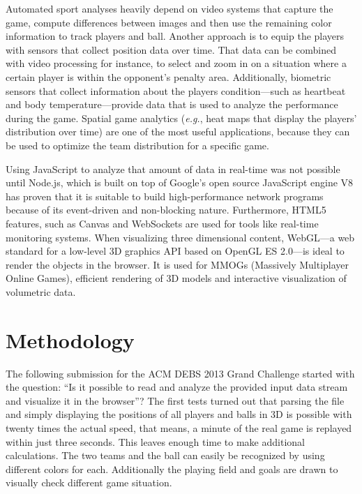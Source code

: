 \documentclass{sig-alternate}
\begin{document}
Automated sport analyses heavily depend on video systems
that capture the game, compute differences between images
and then use the remaining color information
to track players and ball.
Another approach is to equip the players with sensors
that collect position data over time.
That data can be combined with video processing for instance,
to select and zoom in on a situation where a certain player
is within the opponent’s penalty area.
Additionally, biometric sensors that collect information
about the players condition---such as heartbeat
and body temperature---provide data that is used
to analyze the performance during the game.
Spatial game analytics (\emph{e.g.}, heat maps
that display the players’ distribution over time)
are one of the most useful applications,
because they can be used to optimize the team distribution
for a specific game.

Using JavaScript to analyze that amount of data in real-time
was not possible until Node.js,
which is built on top of Google's open source JavaScript engine V8
has proven that it is suitable to build
high-performance network programs
because of its event-driven and non-blocking nature.
Furthermore, HTML5 features, such as Canvas and WebSockets
are used for tools like real-time monitoring systems.
When visualizing three dimensional content,
WebGL---a web standard for a low-level 3D graphics API
based on OpenGL ES 2.0---is ideal to render the objects
in the browser.
It is used for MMOGs (Massively Multiplayer Online Games),
efficient rendering of 3D models
and interactive visualization of volumetric data.

\section{Methodology}
\label{sec:methodology}

The following submission for the ACM DEBS 2013 Grand Challenge
started with the question: ``Is it possible to read and analyze
the provided input data stream and visualize it in the browser''?
The first tests turned out that parsing the file
and simply displaying the positions of all players
and balls in 3D is possible with twenty times the actual speed,
that means, a minute of the real game is replayed
within just three seconds.
This leaves enough time to make additional calculations.
The two teams and the ball can easily be recognized
by using different colors for each.
Additionally the playing field and goals are drawn
to visually check different game situation.
\end{document}

